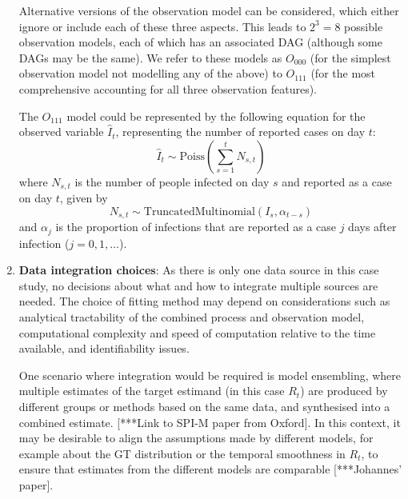\documentclass{article}
\begin{document}
\begin{enumerate}
Alternative versions of the observation model can be considered, which either ignore or include each of these three aspects. This leads to $2^3=8$ possible observation models, each of which has an associated DAG (although some DAGs may be the same).
We refer to these models as $O_{000}$ (for the simplest observation model not modelling any of the above) to $O_{111}$ (for the most comprehensive accounting for all three observation features). 

The $O_{111}$ model could be represented by the following equation for the observed variable $\hat{I}_t$, representing the number of reported cases on day $t$:
\begin{equation}
    \hat{I}_t \sim \mathrm{Poiss}\left( \sum_{s=1}^t N_{s,t}\right)
\end{equation}
where $N_{s,t}$ is the number of people infected on day $s$ and reported as a case on day $t$, given by
\begin{equation}
    N_{s,t} \sim \mathrm{TruncatedMultinomial}\left( I_s, \alpha_{t-s}\right) 
\end{equation}
and $\alpha_j$ is the proportion of infections that are reported as a case $j$ days after infection ($j=0,1,\ldots$). 


\item \textbf{Data integration choices}: As there is only one data source in this case study, no decisions about what and how to integrate multiple sources are needed. The choice of fitting method may depend on considerations such as analytical tractability of the combined process and observation model, computational complexity and speed of computation relative to the time available, and identifiability issues. 
 
One scenario where integration would be required is model ensembling, where multiple estimates of the target estimand (in this case $R_t$) are produced by different groups or methods based on the same data, and synthesised into a combined estimate. [***Link to SPI-M paper from Oxford]. In this context, it may be desirable to align the assumptions made by different models, for example about the GT distribution or the temporal smoothness in $R_t$, to ensure that estimates from the different models are  comparable [***Johannes’ paper].


\end{enumerate}
\end{document}
